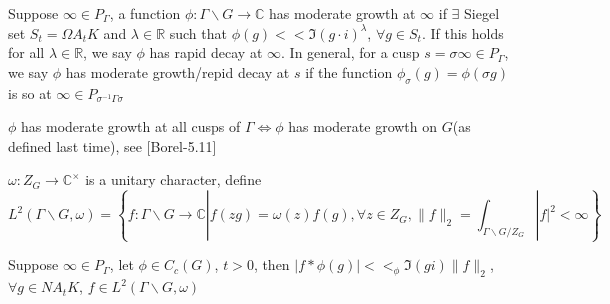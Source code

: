 \documentclass[../main.tex]{subfiles}
\begin{document}
\begin{definition}
Suppose $\infty\in P_\Gamma$, a function $\phi:\Gamma\backslash G\to\mathbb C$ has moderate growth at $\infty$ if $\exists $ Siegel set $S_t=\Omega A_t K$ and $\lambda\in\mathbb R$ such that $\phi(g)<<\Im(g\cdot i)^\lambda$, $\forall g\in S_t$. If this holds for all $\lambda\in\mathbb R$, we say $\phi$ has rapid decay at $\infty$. In general, for a cusp $s=\sigma\infty\in P_\Gamma$, we say $\phi$ has moderate growth/repid decay at $s$ if the function $\phi_\sigma(g)=\phi(\sigma g)$ is so at $\infty\in P_{\sigma^{-1}\Gamma\sigma}$
\end{definition}

\begin{proposition}\label{phi moderate growth at all cusps <=> phi moderate growth on G}
$\phi$ has moderate growth at all cusps of $\Gamma\iff\phi$ has moderate growth on $G$(as defined last time), see [Borel-5.11]
\end{proposition}

\begin{definition}
$\omega:Z_G\to\mathbb C^\times$ is a unitary character, define
\[L^2(\Gamma\backslash G,\omega)=\left\{f:\Gamma\backslash G\to\mathbb C|f(zg)=\omega(z)f(g),\forall z\in Z_G,\|f\|_2=\int_{\Gamma\backslash G/Z_G}|f|^2<\infty\right\}\]
\end{definition}

\begin{proposition}\label{|f*phi(g)|<<_phi Im(gi)|f|_2}
Suppose $\infty\in P_\Gamma$, let $\phi\in C_c(G)$, $t>0$, then $|f*\phi(g)|<<_\phi\Im(gi)\|f\|_2$, $\forall g\in NA_tK$, $f\in L^2(\Gamma\backslash G,\omega)$
\end{proposition}
\end{document}
